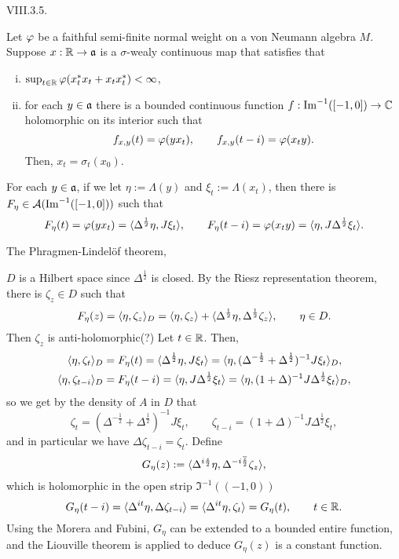 \documentclass{../../../small}
\begin{document}
VIII.3.5.
\begin{thm*}
Let $\varphi$ be a faithful semi-finite normal weight on a von Neumann algebra $M$.
Suppose $x:\mathbb{R}\to\mathfrak{a}$ is a $\sigma$-wealy continuous map that satisfies that
\begin{enumerate}[(i)]
\item $\sup_{t\in\mathbb{R}}\varphi(x_t^*x_t+x_tx_t^*)<\infty$,
\item for each $y\in\mathfrak{a}$ there is a bounded continuous function $f:\operatorname{Im}^{-1}([-1,0])\to\mathbb{C}$ holomorphic on its interior such that
\[f_{x,y}(t)=\varphi(yx_t),\qquad f_{x,y}(t-i)=\varphi(x_ty).\]
Then, $x_t=\sigma_t(x_0)$.
\end{enumerate}
\end{thm*}
\begin{pf}
For each $y\in\mathfrak{a}$, if we let $\eta:=\Lambda(y)$ and $\xi_t:=\Lambda(x_t)$, then there is $F_\eta\in\mathcal{A}(\operatorname{Im}^{-1}([-1,0]))$ such that
\[F_\eta(t)=\varphi(yx_t)=\langle\Delta^{\frac12}\eta,J\xi_t\rangle,\qquad F_\eta(t-i)=\varphi(x_ty)=\langle\eta,J\Delta^{\frac12}\xi_t\rangle.\]


The Phragmen-Lindel\"of theorem, 

$D$ is a Hilbert space since $\Delta^{\frac12}$ is closed.
By the Riesz representation theorem, there is $\zeta_z\in D$ such that
\[F_\eta(z)=\langle\eta,\zeta_z\rangle_D=\langle\eta,\zeta_z\rangle+\langle\Delta^{\frac12}\eta,\Delta^{\frac12}\zeta_z\rangle,\qquad\eta\in D.\]
Then $\zeta_z$ is anti-holomorphic(?)
Let $t\in\mathbb{R}$.
Then,
\begin{align*}
\langle\eta,\zeta_t\rangle_D&=F_\eta(t)=\langle\Delta^{\frac12}\eta,J\xi_t\rangle=\langle\eta,(\Delta^{-\frac12}+\Delta^{\frac12})^{-1}J\xi_t\rangle_D,\\
\langle\eta,\zeta_{t-i}\rangle_D&=F_\eta(t-i)=\langle\eta,J\Delta^{\frac12}\xi_t\rangle=\langle\eta,(1+\Delta)^{-1}J\Delta^{\frac12}\xi_t\rangle_D,
\end{align*}
so we get by the density of $A$ in $D$ that
\[\zeta_t=(\Delta^{-\frac12}+\Delta^{\frac12})^{-1}J\xi_t,\qquad\zeta_{t-i}=(1+\Delta)^{-1}J\Delta^{\frac12}\xi_t,\]
and in particular we have $\Delta\zeta_{t-i}=\zeta_t$.
Define
\[G_\eta(z):=\langle\Delta^{i\frac z2}\eta,\Delta^{-i\frac{\overline z}2}\zeta_z\rangle,\]
which is holomorphic in the open strip $\Im^{-1}((-1,0))$
\[G_\eta(t-i)=\langle\Delta^{it}\eta,\Delta\zeta_{t-i}\rangle=\langle\Delta^{it}\eta,\zeta_t\rangle=G_\eta(t),\qquad t\in\mathbb{R}.\]
Using the Morera and Fubini, $G_\eta$ can be extended to a bounded entire function, and the Liouville theorem is applied to deduce $G_\eta(z)$ is a constant function.


\end{pf}
\fi
\end{document}
